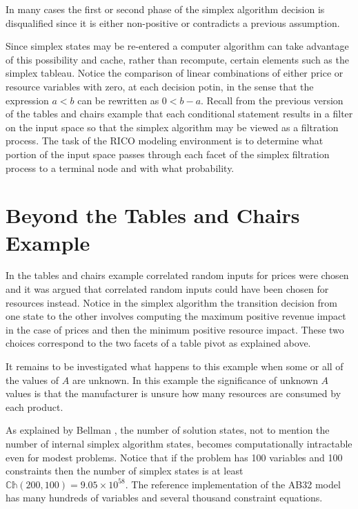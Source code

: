 
In many cases the first or second phase of the simplex algorithm decision is disqualified since it is either non-positive or contradicts a previous assumption. 

Since simplex states may be re-entered a computer algorithm can take advantage of this possibility and cache, rather than recompute, certain elements such as the simplex tableau. Notice the comparison of linear combinations of either price or resource variables with zero, at each decision potin, in the sense that the expression $a < b$ can be rewritten as $0 < b - a$. Recall from the previous version of the tables and chairs example that each conditional statement results in a filter on the input space so that the simplex algorithm may be viewed as a filtration process. The task of the RICO modeling environment is to determine what portion of the input space passes through each facet of the simplex filtration process to a terminal node and with what probability.

\section{Beyond the Tables and Chairs Example}

In the tables and chairs example correlated random inputs for prices were chosen and it was argued that correlated random inputs could have been chosen for resources instead. Notice in the simplex algorithm the transition decision from one state to the other involves computing the maximum positive revenue impact in the case of prices and then the minimum positive resource impact. These two choices correspond to the two facets of a table pivot as explained above. 

It remains to be investigated what happens to this example when some or all of the values of $A$ are unknown. In this example the significance of unknown $A$ values is that the manufacturer is unsure how many resources are consumed by each product.

As explained by Bellman \cite{bellman03}, the number of solution states, not to mention the number of internal simplex algorithm states, becomes computationally intractable even for modest problems. Notice that if the problem has 100 variables and 100 constraints then the number of simplex states is at least $\mathbb{Ch}(200,100) = 9.05\times10^{58}$. The reference implementation of the AB32 model has many hundreds of variables and several thousand constraint equations. 

